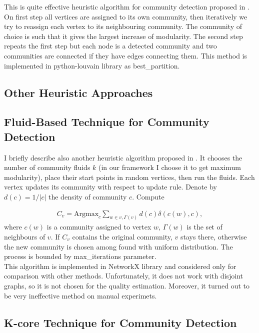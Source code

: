 \documentclass[a4paper]{article}
\begin{document}
This is quite effective heuristic algorithm for community detection proposed in \cite{Blondel:Louvaine}. On first step all vertices are assigned to its own community, then iteratively we try to reassign each vertex to its neighbouring community. The community of choice is such that it gives the largest increase of modularity. The second step repeats the first step but each node is a detected community and two communities are connected if they have edges connecting them. This method is implemented in python-louvain library as best\_partition.

\subsection*{Other Heuristic Approaches}
\subsection*{Fluid-Based Technique for Community Detection}

I briefly describe also another heuristic algorithm proposed in \cite{Pares:Fluid}. It chooses the number of community fluids $k$ (in our framework I choose it to get maximum modularity), place their start points in random vertices, then run the fluids. Each vertex updates its community with respect to update rule. Denote by $d(c)=1/ \vert c \vert$ the density of community $c$. Compute

\begin{align*}
	C_v = \text{Argmax}_{c} \sum_{w \in v,\Gamma(v)} d(c)\delta (c(w),c) ,
\end{align*}
	where $c(w)$ is a community assigned to vertex $w$, $\Gamma (w)$ is the set of neighbours of $v$. If $C_v$ contains the original community, $v$ stays there, otherwise the new community is chosen among found with uniform distribution. The process is bounded by max\_iterations parameter.\\

This algorithm is implemented in NetworkX library and considered only for comparison with other methods. Unfortunately, it does not work with disjoint graphs, so it is not chosen for the quality estimation. Moreover, it turned out to be very ineffective method on manual experimets.

\subsection*{K-core Technique for Community Detection}
\end{document}
